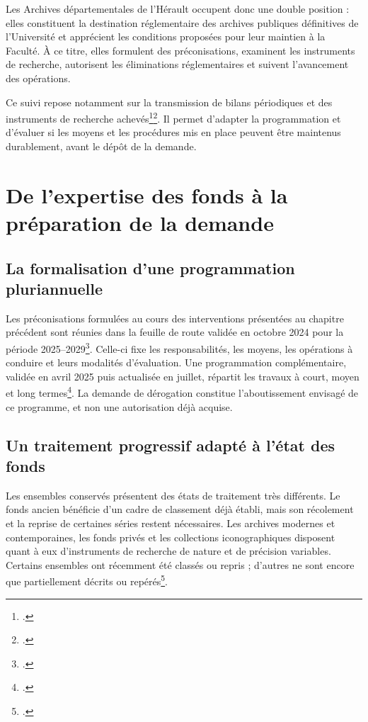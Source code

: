 Les Archives départementales de l'Hérault occupent donc une double position : elles constituent la destination réglementaire des archives publiques définitives de l'Université et apprécient les conditions proposées pour leur maintien à la Faculté. À ce titre, elles formulent des préconisations, examinent les instruments de recherche, autorisent les éliminations réglementaires et suivent l'avancement des opérations.

Ce suivi repose notamment sur la transmission de bilans périodiques et des instruments de recherche achevés\footcite{AHFMBilanSemestriel2025}\footcite{AHFMPointEtapeSeptembre2025}. Il permet d'adapter la programmation et d'évaluer si les moyens et les procédures mis en place peuvent être maintenus durablement, avant le dépôt de la demande.

\section{De l'expertise des fonds à la préparation de la demande}

\subsection{La formalisation d'une programmation pluriannuelle}

Les préconisations formulées au cours des interventions présentées au chapitre précédent sont réunies dans la feuille de route validée en octobre 2024 pour la période 2025--2029\footcite{AHFMFeuilleRoute2025_2029}. Celle-ci fixe les responsabilités, les moyens, les opérations à conduire et leurs modalités d'évaluation. Une programmation complémentaire, validée en avril 2025 puis actualisée en juillet, répartit les travaux à court, moyen et long termes\footcite{AHFMProgrammation2025}. La demande de dérogation constitue l'aboutissement envisagé de ce programme, et non une autorisation déjà acquise.

\subsection{Un traitement progressif adapté à l'état des fonds}

Les ensembles conservés présentent des états de traitement très différents. Le fonds ancien bénéficie d'un cadre de classement déjà établi, mais son récolement et la reprise de certaines séries restent nécessaires. Les archives modernes et contemporaines, les fonds privés et les collections iconographiques disposent quant à eux d'instruments de recherche de nature et de précision variables. Certains ensembles ont récemment été classés ou repris ; d'autres ne sont encore que partiellement décrits ou repérés\footcite{AHFMProgrammation2025}.

